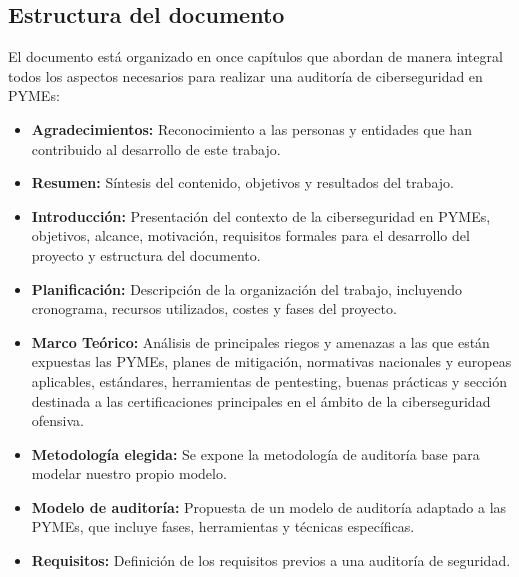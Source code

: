 \documentclass[a4paper, 11pt]{article}
\begin{document}
\par\vspace{0.5cm}

\subsection{Estructura del documento}
\par\vspace{0.5cm}

El documento está organizado en once capítulos que abordan de manera integral todos los aspectos necesarios para realizar una auditoría de ciberseguridad en PYMEs:

\begin{itemize}
    \item \textbf{Agradecimientos:} Reconocimiento a las personas y entidades que han contribuido al desarrollo de este trabajo.
    
    \item \textbf{Resumen:} Síntesis del contenido, objetivos y resultados del trabajo.
    
    \item \textbf{Introducción:} Presentación del contexto de la ciberseguridad en PYMEs, objetivos, alcance, motivación, requisitos formales para el desarrollo del proyecto y estructura del documento.
    
    \item \textbf{Planificación:} Descripción de la organización del trabajo, incluyendo cronograma, recursos utilizados, costes y fases del proyecto.
    
    \item \textbf{Marco Teórico:} Análisis de principales riegos y amenazas a las que están expuestas las PYMEs, planes de mitigación, normativas nacionales y europeas aplicables, estándares, herramientas de pentesting, buenas prácticas y sección destinada a las certificaciones principales en el ámbito de la ciberseguridad ofensiva.
    

    \item \textbf{Metodología elegida:} Se expone la metodología de auditoría base para modelar nuestro propio modelo.
    \item \textbf{Modelo de auditoría:} Propuesta de un modelo de auditoría adaptado a las PYMEs, que incluye fases, herramientas y técnicas específicas.
    \item \textbf{Requisitos:} Definición de los requisitos previos a una auditoría de seguridad.
    

\end{itemize}
\end{document}
